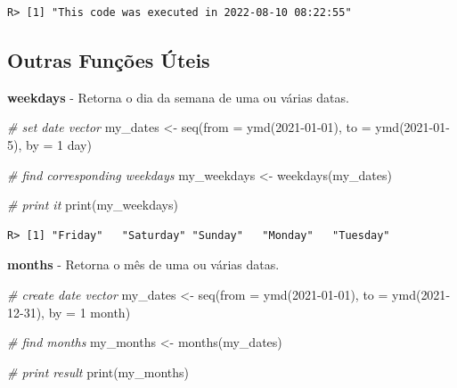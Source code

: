 \documentclass[
  11pt,
]{book}
\newenvironment{Shaded}{\begin{snugshade}}{\end{snugshade}}
\newcommand{\AttributeTok}[1]{\textcolor[rgb]{0.61,0.61,0.61}{#1}}
\newcommand{\CommentTok}[1]{\textcolor[rgb]{0.37,0.37,0.37}{\textit{#1}}}
\newcommand{\FunctionTok}[1]{\textcolor[rgb]{0,0,0}{#1}}
\newcommand{\NormalTok}[1]{#1}
\newcommand{\OtherTok}[1]{\textcolor[rgb]{0.37,0.37,0.37}{#1}}
\newcommand{\StringTok}[1]{\textcolor[rgb]{0.5,0.5,0.5}{#1}}
\begin{document}
\begin{verbatim}
R> [1] "This code was executed in 2022-08-10 08:22:55"
\end{verbatim}

\hypertarget{outras-funuxe7uxf5es-uxfateis-5}{%
\subsection{Outras Funções Úteis}\label{outras-funuxe7uxf5es-uxfateis-5}}

\textbf{weekdays} - Retorna o dia da semana de uma ou várias datas.

\begin{Shaded}
\begin{Highlighting}[]
\CommentTok{\# set date vector}
\NormalTok{my\_dates }\OtherTok{\textless{}{-}} \FunctionTok{seq}\NormalTok{(}\AttributeTok{from =} \FunctionTok{ymd}\NormalTok{(}\StringTok{\textquotesingle{}2021{-}01{-}01\textquotesingle{}}\NormalTok{),}
                \AttributeTok{to =} \FunctionTok{ymd}\NormalTok{(}\StringTok{\textquotesingle{}2021{-}01{-}5\textquotesingle{}}\NormalTok{),}
                \AttributeTok{by =} \StringTok{\textquotesingle{}1 day\textquotesingle{}}\NormalTok{)}

\CommentTok{\# find corresponding weekdays}
\NormalTok{my\_weekdays }\OtherTok{\textless{}{-}} \FunctionTok{weekdays}\NormalTok{(my\_dates)}

\CommentTok{\# print it}
\FunctionTok{print}\NormalTok{(my\_weekdays)}
\end{Highlighting}
\end{Shaded}

\begin{verbatim}
R> [1] "Friday"   "Saturday" "Sunday"   "Monday"   "Tuesday"
\end{verbatim}

\textbf{months} - Retorna o mês de uma ou várias datas.

\begin{Shaded}
\begin{Highlighting}[]
\CommentTok{\# create date vector}
\NormalTok{my\_dates }\OtherTok{\textless{}{-}} \FunctionTok{seq}\NormalTok{(}\AttributeTok{from =} \FunctionTok{ymd}\NormalTok{(}\StringTok{\textquotesingle{}2021{-}01{-}01\textquotesingle{}}\NormalTok{),}
                \AttributeTok{to =} \FunctionTok{ymd}\NormalTok{(}\StringTok{\textquotesingle{}2021{-}12{-}31\textquotesingle{}}\NormalTok{),}
                \AttributeTok{by =} \StringTok{\textquotesingle{}1 month\textquotesingle{}}\NormalTok{)}

\CommentTok{\# find months}
\NormalTok{my\_months }\OtherTok{\textless{}{-}} \FunctionTok{months}\NormalTok{(my\_dates)}

\CommentTok{\# print result}
\FunctionTok{print}\NormalTok{(my\_months)}
\end{Highlighting}
\end{Shaded}
\end{document}
